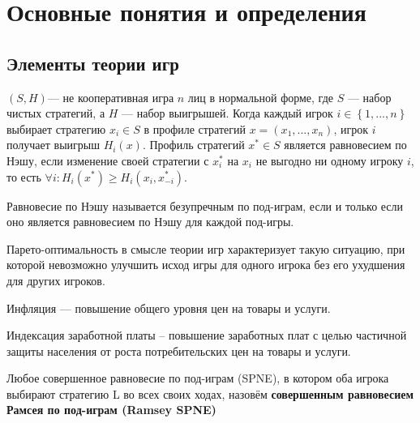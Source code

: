 \section{Основные понятия и определения}
\subsection{Элементы теории игр}

\begin{definition}	$(S,H)$— не кооперативная игра $n$ лиц в нормальной форме, где $S$ — набор чистых стратегий, а $H$ — набор выигрышей. Когда каждый игрок $i \in \left\{1,...,n\right\}$  выбирает стратегию $x_i \in S$  в профиле стратегий $x=(x_1,...,x_n)$, игрок $i$  получает выигрыш $H_i(x)$. Профиль стратегий $x^* \in S$   является равновесием по Нэшу, если изменение своей стратегии с $x_i^*$  на $x_i$  не выгодно ни одному игроку $i$, то есть $\forall i : H_i(x^*) \ge H_i(x_i, x_{-i}^*)$.
\end{definition}
	
\begin{definition}
Равновесие по Нэшу называется безупречным по под-играм, если и только если оно является равновесием по Нэшу для каждой под-игры.
\end{definition}

\begin{definition}
Парето-оптимальность в смысле теории игр характеризует такую ситуацию, при которой невозможно улучшить исход игры для одного игрока без его ухудшения для других игроков.
\end{definition}

\begin{definition}
	Инфляция  — повышение общего уровня цен на товары и услуги.
\end{definition}

\begin{definition}
	Индексация заработной платы – повышение заработных плат с целью частичной защиты населения от роста потребительских цен на товары и услуги.
\end{definition}

\begin{definition}
	Любое совершенное равновесие по под-играм (SPNE), в котором оба игрока выбирают стратегию L во всех своих ходах, назовём \textbf{совершенным равновесием Рамсея по под-играм (Ramsey SPNE)}
\end{definition}

